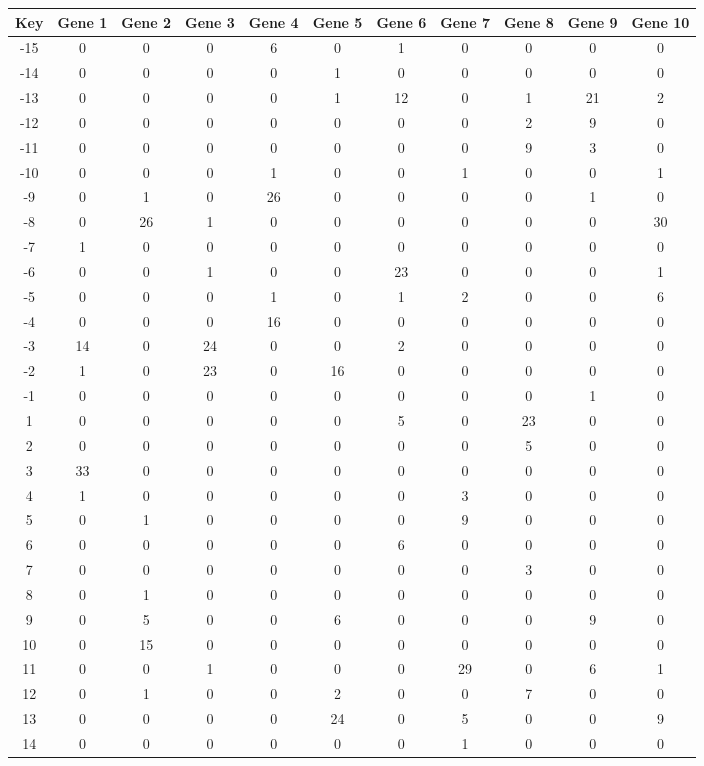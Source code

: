 \begin{tabular}{|c|c|c|c|c|c|c|c|c|c|c|}
\hline
Key & Gene 1 & Gene 2 & Gene 3 & Gene 4 & Gene 5 & Gene 6 & Gene 7 & Gene 8 & Gene 9 & Gene 10 \\
\hline
-15 & 0 & 0 & 0 & 6 & 0 & 1 & 0 & 0 & 0 & 0 \\
-14 & 0 & 0 & 0 & 0 & 1 & 0 & 0 & 0 & 0 & 0 \\
-13 & 0 & 0 & 0 & 0 & 1 & 12 & 0 & 1 & 21 & 2 \\
-12 & 0 & 0 & 0 & 0 & 0 & 0 & 0 & 2 & 9 & 0 \\
-11 & 0 & 0 & 0 & 0 & 0 & 0 & 0 & 9 & 3 & 0 \\
-10 & 0 & 0 & 0 & 1 & 0 & 0 & 1 & 0 & 0 & 1 \\
-9 & 0 & 1 & 0 & 26 & 0 & 0 & 0 & 0 & 1 & 0 \\
-8 & 0 & 26 & 1 & 0 & 0 & 0 & 0 & 0 & 0 & 30 \\
-7 & 1 & 0 & 0 & 0 & 0 & 0 & 0 & 0 & 0 & 0 \\
-6 & 0 & 0 & 1 & 0 & 0 & 23 & 0 & 0 & 0 & 1 \\
-5 & 0 & 0 & 0 & 1 & 0 & 1 & 2 & 0 & 0 & 6 \\
-4 & 0 & 0 & 0 & 16 & 0 & 0 & 0 & 0 & 0 & 0 \\
-3 & 14 & 0 & 24 & 0 & 0 & 2 & 0 & 0 & 0 & 0 \\
-2 & 1 & 0 & 23 & 0 & 16 & 0 & 0 & 0 & 0 & 0 \\
-1 & 0 & 0 & 0 & 0 & 0 & 0 & 0 & 0 & 1 & 0 \\
1 & 0 & 0 & 0 & 0 & 0 & 5 & 0 & 23 & 0 & 0 \\
2 & 0 & 0 & 0 & 0 & 0 & 0 & 0 & 5 & 0 & 0 \\
3 & 33 & 0 & 0 & 0 & 0 & 0 & 0 & 0 & 0 & 0 \\
4 & 1 & 0 & 0 & 0 & 0 & 0 & 3 & 0 & 0 & 0 \\
5 & 0 & 1 & 0 & 0 & 0 & 0 & 9 & 0 & 0 & 0 \\
6 & 0 & 0 & 0 & 0 & 0 & 6 & 0 & 0 & 0 & 0 \\
7 & 0 & 0 & 0 & 0 & 0 & 0 & 0 & 3 & 0 & 0 \\
8 & 0 & 1 & 0 & 0 & 0 & 0 & 0 & 0 & 0 & 0 \\
9 & 0 & 5 & 0 & 0 & 6 & 0 & 0 & 0 & 9 & 0 \\
10 & 0 & 15 & 0 & 0 & 0 & 0 & 0 & 0 & 0 & 0 \\
11 & 0 & 0 & 1 & 0 & 0 & 0 & 29 & 0 & 6 & 1 \\
12 & 0 & 1 & 0 & 0 & 2 & 0 & 0 & 7 & 0 & 0 \\
13 & 0 & 0 & 0 & 0 & 24 & 0 & 5 & 0 & 0 & 9 \\
14 & 0 & 0 & 0 & 0 & 0 & 0 & 1 & 0 & 0 & 0 \\
\hline
\end{tabular}